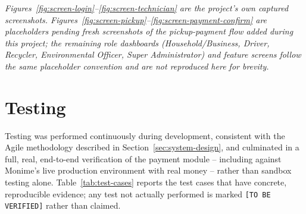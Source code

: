 \textit{Figures~\ref{fig:screen-login}--\ref{fig:screen-technician} are the
project's own captured screenshots. Figures~\ref{fig:screen-pickup}--\ref{fig:screen-payment-confirm}
are placeholders pending fresh screenshots of the pickup-payment flow added
during this project; the remaining role dashboards (Household/Business,
Driver, Recycler, Environmental Officer, Super Administrator) and feature
screens follow the same placeholder convention and are not reproduced here
for brevity.}

\section{Testing}
\label{sec:testing}

Testing was performed continuously during development, consistent with the
Agile methodology described in Section~\ref{sec:system-design}, and
culminated in a full, real, end-to-end verification of the payment module --
including against Monime's live production environment with real money --
rather than sandbox testing alone. Table~\ref{tab:test-cases} reports the test
cases that have concrete, reproducible evidence; any test not actually
performed is marked \texttt{[TO BE VERIFIED]} rather than claimed.

